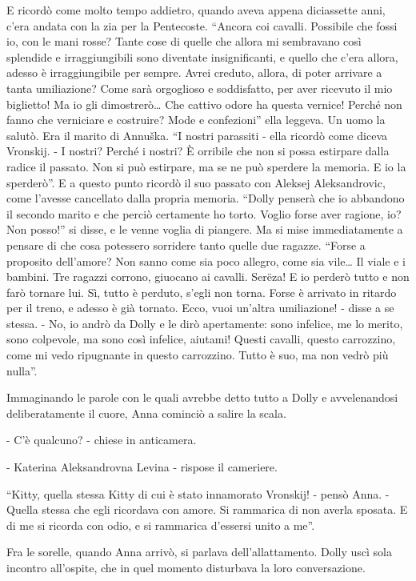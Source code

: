 E ricordò come molto tempo addietro, quando aveva appena diciassette anni, c'era andata con la zia per la Pentecoste. ``Ancora coi cavalli. Possibile che fossi io, con le mani rosse? Tante cose di quelle che allora mi sembravano così splendide e irraggiungibili sono diventate insignificanti, e quello che c'era allora, adesso è irraggiungibile per sempre. Avrei creduto, allora, di poter arrivare a tanta umiliazione? Come sarà orgoglioso e soddisfatto, per aver ricevuto il mio biglietto! Ma io gli dimostrerò\ldots{} Che cattivo odore ha questa vernice! Perché non fanno che verniciare e costruire? Mode e confezioni'' ella leggeva. Un uomo la salutò. Era il marito di Annuška. ``I nostri parassiti - ella ricordò come diceva Vronskij. - I nostri? Perché i nostri? È orribile che non si possa estirpare dalla radice il passato. Non si può estirpare, ma se ne può sperdere la memoria. E io la sperderò''. E a questo punto ricordò il suo passato con Aleksej Aleksandrovic, come l'avesse cancellato dalla propria memoria. ``Dolly penserà che io abbandono il secondo marito e che perciò certamente ho torto. Voglio forse aver ragione, io? Non posso!'' si disse, e le venne voglia di piangere. Ma si mise immediatamente a pensare di che cosa potessero sorridere tanto quelle due ragazze. ``Forse a proposito dell'amore? Non sanno come sia poco allegro, come sia vile\ldots{} Il viale e i bambini. Tre ragazzi corrono, giuocano ai cavalli. Serëza! E io perderò tutto e non farò tornare lui. Sì, tutto è perduto, s'egli non torna. Forse è arrivato in ritardo per il treno, e adesso è già tornato. Ecco, vuoi un'altra umiliazione! - disse a se stessa. - No, io andrò da Dolly e le dirò apertamente: sono infelice, me lo merito, sono colpevole, ma sono così infelice, aiutami! Questi cavalli, questo carrozzino, come mi vedo ripugnante in questo carrozzino. Tutto è suo, ma non vedrò più nulla''. 

Immaginando le parole con le quali avrebbe detto tutto a Dolly e avvelenandosi deliberatamente il cuore, Anna cominciò a salire la scala. 

- C'è qualcuno? - chiese in anticamera. 

- Katerina Aleksandrovna Levina - rispose il cameriere. 

``Kitty, quella stessa Kitty di cui è stato innamorato Vronskij! - pensò Anna. - Quella stessa che egli ricordava con amore. Si rammarica di non averla sposata. E di me si ricorda con odio, e si rammarica d'essersi unito a me''. 

Fra le sorelle, quando Anna arrivò, si parlava dell'allattamento. Dolly uscì sola incontro all'ospite, che in quel momento disturbava la loro conversazione. 


